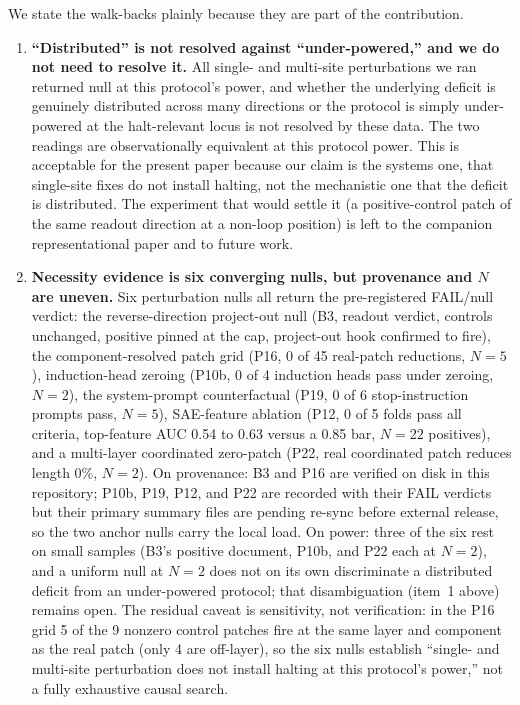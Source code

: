 \documentclass[11pt]{article}
\begin{document}
We state the walk-backs plainly because they are part of the contribution.

\begin{enumerate}
  \item \textbf{``Distributed'' is not resolved against ``under-powered,'' and we do not
  need to resolve it.} All single- and multi-site perturbations we ran returned null at this
  protocol's power, and whether the underlying deficit is genuinely distributed across many
  directions or the protocol is simply under-powered at the halt-relevant locus is not
  resolved by these data. The two readings are observationally equivalent at this protocol
  power. This is acceptable for the present paper because our claim is the systems one, that
  single-site fixes do not install halting, not the mechanistic one that the deficit is
  distributed. The experiment that would settle it (a positive-control patch of the same
  readout direction at a non-loop position) is left to the companion representational paper
  and to future work.

  \item \textbf{Necessity evidence is six converging nulls, but provenance and $N$ are
  uneven.} Six perturbation nulls all return the pre-registered FAIL/null verdict: the
  reverse-direction project-out null (B3, readout verdict, controls unchanged, positive
  pinned at the cap, project-out hook confirmed to fire), the component-resolved patch grid
  (P16, 0 of 45 real-patch reductions, $N=5$), induction-head zeroing (P10b, 0 of 4 induction
  heads pass under zeroing, $N=2$), the system-prompt counterfactual (P19, 0 of 6
  stop-instruction prompts pass, $N=5$), SAE-feature ablation (P12, 0 of 5 folds pass all
  criteria, top-feature AUC 0.54 to 0.63 versus a 0.85 bar, $N=22$ positives), and a
  multi-layer coordinated zero-patch (P22, real coordinated patch reduces length 0\%, $N=2$).
  On provenance: B3 and P16 are verified on disk in this repository; P10b, P19, P12, and P22
  are recorded with their FAIL verdicts but their primary summary files are pending re-sync
  before external release, so the two anchor nulls carry the local load. On power: three of
  the six rest on small samples (B3's positive document, P10b, and P22 each at $N=2$), and a
  uniform null at $N=2$ does not on its own discriminate a distributed deficit from an
  under-powered protocol; that disambiguation (item~1 above) remains open. The residual
  caveat is sensitivity, not verification: in the P16 grid 5 of the 9 nonzero control patches
  fire at the same layer and component as the real patch (only 4 are off-layer), so the six
  nulls establish ``single- and multi-site perturbation does not install halting at this
  protocol's power,'' not a fully exhaustive causal search.


\end{enumerate}
\end{document}
